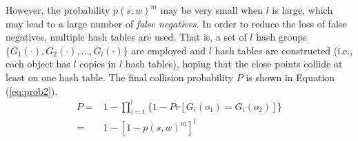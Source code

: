 However, the probability $p(s,w)^m$ may be very small when $l$ is large, which may lead to a large number of \emph{false negatives}. In order to reduce the loss of false negatives, multiple hash tables are used. That is, a set of $l$ hash groups $\{G_1(\cdot),G_2(\cdot),\ldots,G_l(\cdot)\}$ are employed and $l$ hash tables are constructed (i.e., each object has $l$ copies in $l$ hash tables), hoping that the close points collide at least on one hash table. The final collision probability $P$ is shown in Equation (\ref{eq:prob2}).
\begin{equation}\label{eq:prob2}
%
\begin{aligned}
%
  P=&1-\prod_{i=1}^l \Big\{1-Pr[G_i(o_1)=G_i(o_2)]\Big\}\\
  =&1-[1-p(s,w)^m]^l
\end{aligned}
%
\end{equation}
